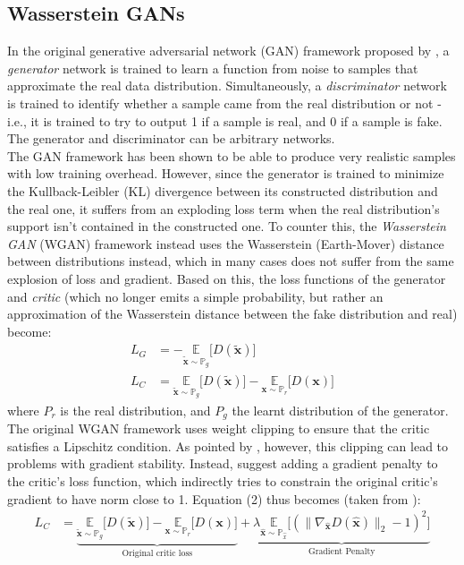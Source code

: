\subsection{Wasserstein GANs} %
\label{sub:Wasserstein_GANsh}
In the original generative adversarial network (GAN) framework proposed by \cite{goodfellow2014generative}, a \textit{generator} network is trained to learn a function from noise to samples that approximate the real data distribution. Simultaneously, a \textit{discriminator} network is trained to identify whether a sample came from the real distribution or not - i.e., it is trained to try to output 1 if a sample is real, and 0 if a sample is fake. The generator and discriminator can be arbitrary networks. \\
The GAN framework has been shown to be able to produce very realistic samples with low training overhead. However, since the generator is trained to minimize the Kullback-Leibler (KL) divergence between its constructed distribution and the real one, it suffers from an exploding loss term when the real distribution's support isn't contained in the constructed one. To counter this, the \textit{Wasserstein GAN} \cite{arjovsky2017wasserstein} (WGAN) framework instead uses the Wasserstein (Earth-Mover) distance between distributions instead, which in many cases does not suffer from the same explosion of loss and gradient. Based on this, the loss functions of the generator and \textit{critic} (which no longer emits a simple probability, but rather an approximation of the Wasserstein distance between the fake distribution and real) become:
\begin{align}
    L_G &= -\underset{\boldsymbol{\widetilde{x}} \sim \mathbb{P}_{g}}{\mathbb{E}}  \big[D(\boldsymbol{\widetilde{x}})\big] \\
    L_C &= \underset{\boldsymbol{\widetilde{x}} \sim \mathbb{P}_{g}}{\mathbb{E}}  \big[D(\boldsymbol{\widetilde{x}})\big] - \underset{\boldsymbol{x} \sim \mathbb{P}_{r}}{\mathbb{E}}  \big[D(\boldsymbol{x})\big]
\end{align}
where $P_r$ is the real distribution, and $P_g$ the learnt distribution of the generator. \\
The original WGAN framework uses weight clipping to ensure that the critic satisfies a Lipschitz condition. As pointed by \cite{gulrajani2017improved}, however, this clipping can lead to problems with gradient stability. Instead, \cite{gulrajani2017improved} suggest adding a gradient penalty to the critic's loss function, which indirectly tries to constrain the original critic's gradient to have norm close to 1. Equation (2) thus becomes (taken from \cite{gulrajani2017improved}):
\begin{align}
    L_C &= \underbrace{\underset{\boldsymbol{\widetilde{x}} \sim \mathbb{P}_{g}}{\mathbb{E}}  \big[D(\boldsymbol{\widetilde{x}})\big] - \underset{\boldsymbol{x} \sim \mathbb{P}_{r}}{\mathbb{E}}  \big[D(\boldsymbol{x})\big]}_\text{Original critic loss}  + \underbrace{\lambda \underset{\boldsymbol{\hat{x}} \sim \mathbb{P}_{\hat{x}}}{\mathbb{E}}  \big[(\lVert \nabla_{\boldsymbol{\hat{x}}} D(\boldsymbol{\hat{x}}) \rVert_2 - 1)^2\big]}_\text{Gradient Penalty}
\end{align}

